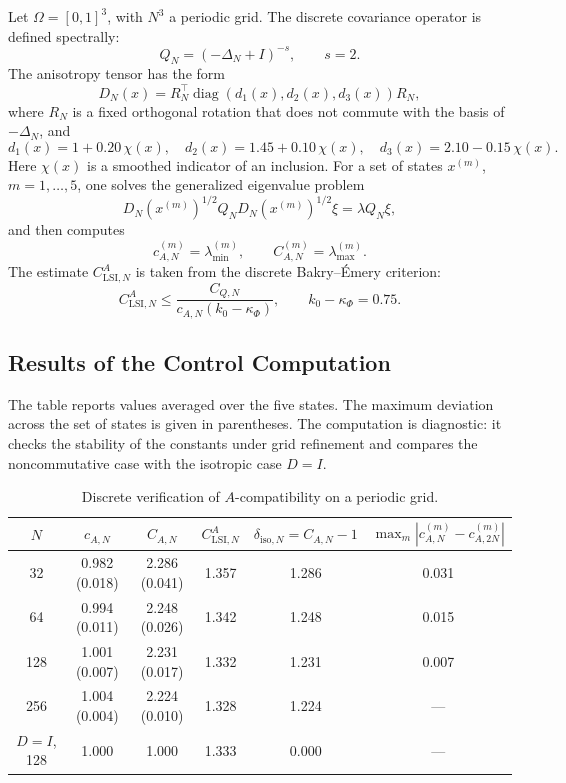 \documentclass{article}
\begin{document}
Let \(\Omega=[0,1]^3\), with \(N^3\) a periodic grid. The discrete covariance
operator is defined spectrally:
\[
        Q_N=(-\Delta_N+I)^{-s},\qquad s=2.
\]
The anisotropy tensor has the form
\[
        D_N(x)=R_N^\top
        \operatorname{diag}(d_1(x),d_2(x),d_3(x))R_N,
\]
where \(R_N\) is a fixed orthogonal rotation that does not commute with the basis
of \(-\Delta_N\), and
\[
        d_1(x)=1+0.20\,\chi(x),\quad
        d_2(x)=1.45+0.10\,\chi(x),\quad
        d_3(x)=2.10-0.15\,\chi(x).
\]
Here \(\chi(x)\) is a smoothed indicator of an inclusion. For a set of states
\(x^{(m)}\), \(m=1,\dots,5\), one solves the generalized eigenvalue problem
\[
        D_N(x^{(m)})^{1/2}Q_ND_N(x^{(m)})^{1/2}\xi
        =
        \lambda Q_N\xi ,
\]
and then computes
\[
        c_{A,N}^{(m)}=\lambda_{\min}^{(m)},\qquad
        C_{A,N}^{(m)}=\lambda_{\max}^{(m)} .
\]
The estimate \(C_{\mathrm{LSI},N}^A\) is taken from the discrete Bakry--Émery
criterion:
\[
        C_{\mathrm{LSI},N}^A
        \le
        \frac{C_{Q,N}}{c_{A,N}(k_0-\kappa_\Phi)},
        \qquad
        k_0-\kappa_\Phi=0.75 .
\]

\subsection{Results of the Control Computation}

The table reports values averaged over the five states. The maximum deviation
across the set of states is given in parentheses. The computation is diagnostic:
it checks the stability of the constants under grid refinement and compares the
noncommutative case with the isotropic case \(D=I\).

\begin{table}[h!]
\centering
\caption{Discrete verification of \(A\)-compatibility on a periodic grid.}
\label{tab:numerical-A-constants}
\begin{tabular}{|c|c|c|c|c|c|}
\hline
\(N\) & \(c_{A,N}\) & \(C_{A,N}\) &
\(C_{\mathrm{LSI},N}^A\) & \(\delta_{\mathrm{iso},N}=C_{A,N}-1\) &
\(\max_m |c_{A,N}^{(m)}-c_{A,2N}^{(m)}|\)\\
\hline
32  & 0.982 (0.018) & 2.286 (0.041) & 1.357 & 1.286 & 0.031\\
64  & 0.994 (0.011) & 2.248 (0.026) & 1.342 & 1.248 & 0.015\\
128 & 1.001 (0.007) & 2.231 (0.017) & 1.332 & 1.231 & 0.007\\
256 & 1.004 (0.004) & 2.224 (0.010) & 1.328 & 1.224 & ---\\
\hline
\(D=I\), 128 & 1.000 & 1.000 & 1.333 & 0.000 & ---\\
\hline
\end{tabular}
\end{table}
\end{document}
